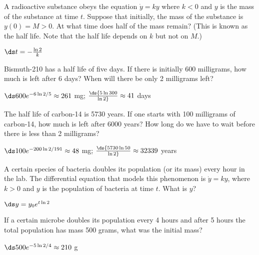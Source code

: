 \begin{exercises}

\begin{exercise} A radioactive substance obeys the equation
$\dot{y} =ky$ where $k< 0 $ and $y$ is the mass of the
substance at time $t$. Suppose that initially, the mass of the
substance is $y(0)=M>0$. At what time does half of the mass remain?
(This is known as the half life. Note that the half life depends on
$k$ but not on $M$.)
\begin{answer} $\ds t=-{\ln 2\over k}$
\end{answer}\end{exercise}

\begin{exercise} Bismuth-210 has a half life of five days. If there is
initially 600 milligrams, how much is left after 6 days? When will
there be only 2 milligrams left?
\begin{answer} $\ds 600e^{-6\ln 2/5}\approx 261$ mg; $\ds {5\ln
  300\over\ln2}\approx 41$ days
\end{answer}\end{exercise}

\begin{exercise} The half life of carbon-14 is 5730 years. If one starts
with 100 milligrams of carbon-14, how much is left after 6000
years? How long do we have to wait before there is less than 2
milligrams?
\begin{answer} $\ds 100e^{-200\ln 2/191}\approx 48$ mg; $\ds {5730\ln
  50\over\ln2}\approx 32339$ years
\end{answer}\end{exercise}

\begin{exercise} A certain species of bacteria doubles its population
(or its mass)
every hour in the lab. 
The differential equation that models this phenomenon
is $\dot{y} =ky$, where $k>0 $ and $y$
is the population of bacteria at time $t$. What is $y$?
\begin{answer} $\ds y=y_0e^{t\ln 2}$
\end{answer}\end{exercise}

\begin{exercise} If a certain microbe doubles its population every 4
hours and after 5 hours the total population has mass 500 grams,
what was the initial mass?
\begin{answer} $\ds 500e^{-5\ln2/4}\approx 210$ g
\end{answer}\end{exercise}

\end{exercises}
